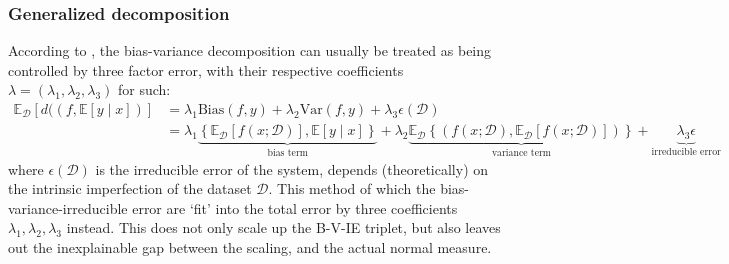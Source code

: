 \subsubsection{Generalized decomposition}

According to \cite{domingos_unified_aaai_2000,domingos_unified_2000}, the bias-variance decomposition can usually be treated as being controlled by three factor error, with their respective coefficients $\lambda=(\lambda_{1},\lambda_{2},\lambda_{3})$ for such: 
    \noindent 
    \begin{equation*}
        \begin{split}
            \mathbb{E}_{\mathcal{D}} \left[d((f,\mathbb{E}[y\mid x])\right] 
            &= \lambda_{1} \mathrm{Bias}(f,y) + \lambda_{2}\mathrm{Var}(f,y)+ \lambda_{3}\epsilon(\mathcal{D}) \\
            &= \lambda_{1}\underbrace{\left\{ \mathbb{E}_{\mathcal{D}}[f(x;\mathcal{D})] , \mathbb{E}[y\mid x] \right\}}_{\text{bias term}} 
             +\lambda_{2} \underbrace{\mathbb{E}_{\mathcal{D}} \left\{(f(x;\mathcal{D}), \mathbb{E}_{\mathcal{D}}[f(x;\mathcal{D})])\right\}}_{\text{variance term}} 
            +\underbrace{\lambda_{3}\epsilon}_{\text{irreducible error}}
        \end{split}
        \end{equation*}
where $\epsilon(\mathcal{D})$ is the irreducible error of the system, depends (theoretically) on the intrinsic imperfection of the dataset $\mathcal{D}$. This method of which the bias-variance-irreducible error are `fit' into the total error by three coefficients $\lambda_{1},\lambda_{2},\lambda_{3}$ instead. This does not only scale up the B-V-IE triplet, but also leaves out the inexplainable gap between the scaling, and the actual normal measure. 





